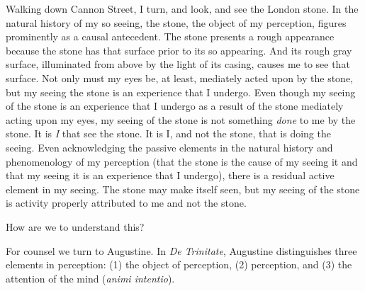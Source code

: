 \documentclass[12pt]{article}
\begin{document}
Walking down Cannon Street, I turn, and look, and see the London stone. In the natural history of my so seeing, the stone, the object of my perception, figures prominently as a causal antecedent. The stone presents a rough appearance because the stone has that surface prior to its so appearing. And its rough gray surface, illuminated from above by the light of its casing, causes me to see that surface. 
Not only must my eyes be, at least, mediately acted upon by the stone, but my seeing the stone is an experience that I undergo. Even though my seeing of the stone is an experience that I undergo as a result of the stone mediately acting upon my eyes, my seeing of the stone is not something \emph{done} to me by the stone. It is \emph{I} that see the stone. It is I, and not the stone, that is doing the seeing. Even acknowledging the passive elements in the natural history and phenomenology of my perception (that the stone is the cause of my seeing it and that my seeing it is an experience that I undergo), there is a residual active element in my seeing. The stone may make itself seen, but my seeing of the stone is activity properly attributed to me and not the stone.

How are we to understand this?

For counsel we turn to Augustine. In \emph{De Trinitate}, Augustine distinguishes three elements in perception: (1) the object of perception, (2) perception, and (3) the attention of the mind (\emph{animi intentio}).
\end{document}
